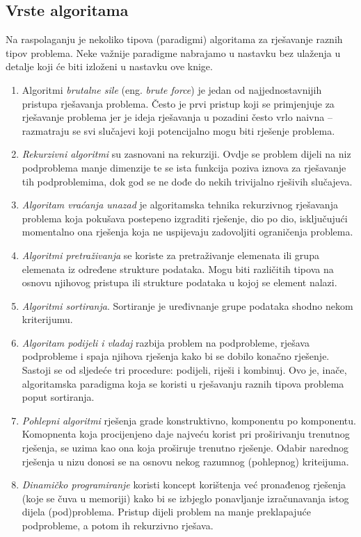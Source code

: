  \subsection{Vrste algoritama}
Na raspolaganju je nekoliko tipova (paradigmi) algoritama za rješavanje raznih tipov problema. Neke važnije paradigme nabrajamo u nastavku bez ulaženja u detalje koji će biti izloženi u nastavku ove knige. 
\begin{enumerate}
	\item Algoritmi \textit{brutalne sile} (eng. \textit{brute force}) je jedan od najjednostavnijih pristupa rješavanja problema. Često je prvi pristup koji se primjenjuje za  rješavanje problema jer je ideja rješavanja u pozadini često vrlo naivna -- razmatraju se svi slučajevi koji  potencijalno mogu biti rješenje problema.
	\item \textit{Rekurzivni algoritmi}  su zasnovani na rekurziji. Ovdje se problem dijeli na niz podproblema manje dimenzije te  se ista funkcija poziva iznova za rješavanje tih podproblemima, dok god se ne dođe do nekih trivijalno rješivih slučajeva.
	\item \textit{Algoritam vraćanja unazad} je algoritamska tehnika rekurzivnog rješa\-vanja problema koja pokušava postepeno izgraditi rješenje, dio po dio, isključu\-jući momentalno ona rješenja koja ne uspijevaju zadovoljiti ograničenja problema. 
	\item  \textit{Algoritmi pretraživanja} se koriste za pretraživanje elemenata ili grupa elemenata iz određene strukture podataka. Mogu biti različitih tipova na osnovu njihovog pristupa ili strukture podataka u kojoj se element nalazi.
	\item \textit{Algoritmi sortiranja}.  Sortiranje je uređivnanje grupe podataka  shodno nekom kriterijumu. %
	\item \textit{Algoritam podijeli i vladaj}  razbija problem na podpro\-bleme, rješava podprobleme i spaja njihova rješenja kako bi se dobilo konačno rješenje. Sastoji se od sljedeće tri procedure:
    podijeli, riješi i kombinuj. Ovo je, inače, algoritamska paradigma koja se koristi u rješavanju raznih tipova problema poput sortiranja.
  
    \item \textit{Pohlepni algoritmi}  rješenja grade konstruktivno, komponentu po ko\-mponentu.   Komopnenta koja procijenjeno daje najveću korist pri proširivanju trenutnog rješenja, se uzima kao ona koja  proširuje trenu\-tno  rješenje. Odabir  narednog rješenja u nizu donosi se na osnovu nekog razumnog (pohlepnog) kriteijuma.
    \item \textit{Dinamičko programiranje} koristi koncept korištenja već pronađenog rješenja (koje se čuva u memoriji) kako bi se izbjeglo ponavljanje izračunavanja istog dijela (pod)problema. Pristup  dijeli problem na manje preklapajuće podprobleme,  a potom ih rekurzivno rješava.
\end{enumerate}
   
